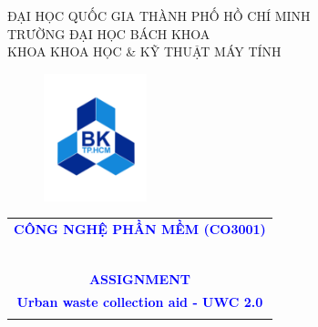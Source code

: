 \documentclass[a4paper]{article}
\begin{document}
\begin{titlepage}
\begin{center}
ĐẠI HỌC QUỐC GIA THÀNH PHỐ HỒ CHÍ MINH \\
TRƯỜNG ĐẠI HỌC BÁCH KHOA \\
KHOA KHOA HỌC \& KỸ THUẬT MÁY TÍNH 
\end{center}

\vspace{1cm}

\begin{figure}[h!]
\begin{center}
\includegraphics[width=3cm]{BK.png}
\end{center}
\end{figure}

\vspace{1cm}


\begin{center}

\begin{tabular}{c}
\multicolumn{1}{l}{\textbf{{\Large\textcolor{blue}{ CÔNG NGHỆ PHẦN MỀM (CO3001)}}}}\\

~~\\
\hline
\\

\textbf{\large \textcolor{blue}{ASSIGNMENT\vspace{0.2cm} }} \\
\textbf{\large \textcolor{blue}{Urban waste collection aid - UWC 2.0}}
\\
\textbf{\large \textcolor{blue}{}}
\\
\hline
\end{tabular}
\end{center}

\vspace{1.5cm}


\end{titlepage}
\end{document}
